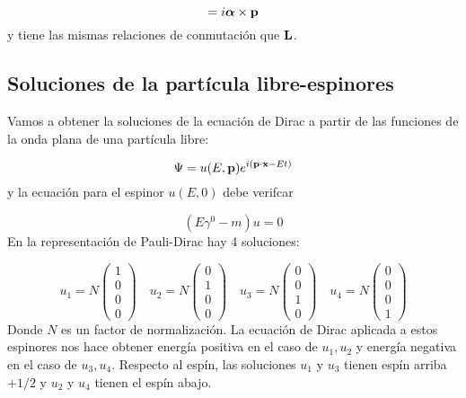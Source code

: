 \begin{equation}
	[\Hcal,\Sn] =  i \alphan \times \pn
\end{equation}
y tiene las mismas relaciones de conmutación que $\mathbf{L}$. 

\subsection{Soluciones de la partícula libre-espinores}

Vamos a obtener la soluciones de la ecuación de Dirac a partir de las funciones de la onda plana de una partícula libre:

\begin{equation}
	\Psi = u(E,\mathbf{p}) e^{i(\mathbf{p} \cdot \mathbf{x} - Et)}
\end{equation}
y la ecuación para el espinor $u(E,0)$ debe verifcar

\begin{equation}
	(E\gamma^0-m)u=0
\end{equation}
En la representación de Pauli-Dirac hay 4 soluciones:


\begin{equation}
	u_1 = N \begin{pmatrix}
		1 \\ 0 \\ 0 \\ 0
	\end{pmatrix}
	\quad
 	u_2 = N  \begin{pmatrix}
 		0 \\ 1 \\ 0 \\ 0
	\end{pmatrix}
	\quad	
	u_3 = N  \begin{pmatrix}
		0 \\ 0 \\ 1 \\ 0
	\end{pmatrix}
	\quad	
	u_4 = N  \begin{pmatrix}
		0 \\ 0 \\ 0 \\ 1
	\end{pmatrix}
\end{equation}
Donde $N$ es un factor de normalización. La ecuación de Dirac aplicada a estos espinores nos hace obtener energía positiva en el caso de $u_1,u_2$ y energía negativa en el caso de $u_3,u_4$. Respecto al espín, las soluciones $u_1$ y $u_3$ tienen espín arriba $+1/2$ y $u_2$ y $u_4$ tienen el espín abajo. 


